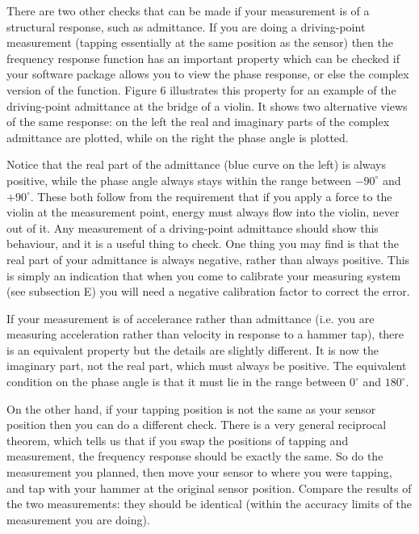
  There are two other checks that can be made if your measurement is of a 
  structural response, such as admittance. If you are doing a driving-point 
  measurement (tapping essentially at the same position as the sensor) then the 
  frequency response function has an important property which can be checked if 
  your software package allows you to view the phase response, or else the 
  complex version of the function. Figure 6 illustrates this property for an 
  example of the driving-point admittance at the bridge of a violin. It shows 
  two alternative views of the same response: on the left the real and 
  imaginary parts of the complex admittance are plotted, while on the right the 
  phase angle is plotted. 

  Notice that the real part of the admittance (blue curve on the left) is 
  always positive, while the phase angle always stays within the range between 
  $-90^\circ$ and $+90^\circ$. These both follow from the requirement that if 
  you apply a force to the violin at the measurement point, energy must always 
  flow into the violin, never out of it. Any measurement of a driving-point 
  admittance should show this behaviour, and it is a useful thing to check. One 
  thing you may find is that the real part of your admittance is always 
  negative, rather than always positive. This is simply an indication that when 
  you come to calibrate your measuring system (see subsection E) you will need 
  a negative calibration factor to correct the error. 

  If your measurement is of accelerance rather than admittance (i.e. you are 
  measuring acceleration rather than velocity in response to a hammer tap), 
  there is an equivalent property but the details are slightly different. It is 
  now the imaginary part, not the real part, which must always be positive. The 
  equivalent condition on the phase angle is that it must lie in the range 
  between $0^\circ$ and $180^\circ$. 

  On the other hand, if your tapping position is not the same as your sensor 
  position then you can do a different check. There is a very general 
  reciprocal theorem, which tells us that if you swap the positions of tapping 
  and measurement, the frequency response should be exactly the same. So do the 
  measurement you planned, then move your sensor to where you were tapping, and 
  tap with your hammer at the original sensor position. Compare the results of 
  the two measurements: they should be identical (within the accuracy limits of 
  the measurement you are doing). 

